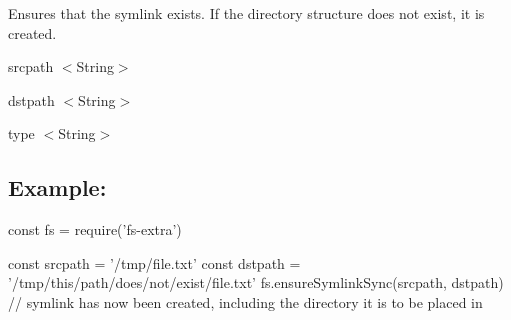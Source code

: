Ensures that the symlink exists. If the directory structure does not exist, it is created.


\begin{DoxyItemize}
\item {\ttfamily srcpath} {\ttfamily $<$String$>$}
\item {\ttfamily dstpath} {\ttfamily $<$String$>$}
\item {\ttfamily type} {\ttfamily $<$String$>$}
\end{DoxyItemize}

\subsection*{Example\+:}


\begin{DoxyCode}
const fs = require('fs-extra')

const srcpath = '/tmp/file.txt'
const dstpath = '/tmp/this/path/does/not/exist/file.txt'
fs.ensureSymlinkSync(srcpath, dstpath)
// symlink has now been created, including the directory it is to be placed in
\end{DoxyCode}
 
